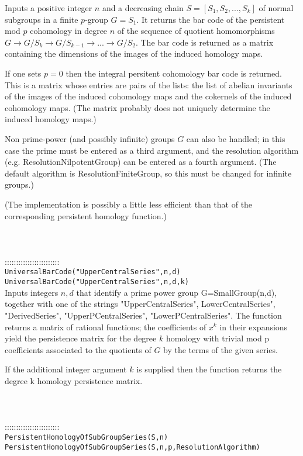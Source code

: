 \documentclass[a4paper,11pt]{report}
\begin{document}
{ Inputs a positive integer $n$ and a decreasing chain $S=[S_1, S_2, ..., S_k]$ of normal subgroups in a finite $p$-group $G=S_1$. It returns the bar code of the persistent mod $p$ cohomology in degree $n$ of the sequence of quotient homomorphisms $G \rightarrow G/S_k \rightarrow G/S_{k-1} \rightarrow ... \rightarrow G/S_2 $. The bar code is returned as a matrix containing the dimensions of the images
of the induced homology maps. 

 If one sets $p=0$ then the integral persitent cohomology bar code is returned. This is a matrix
whose entries are pairs of the lists: the list of abelian invariants of the
images of the induced cohomology maps and the cokernels of the induced
cohomology maps. (The matrix probably does not uniquely determine the induced
homology maps.) 

 Non prime-power (and possibly infinite) groups $G$ can also be handled; in this case the prime must be entered as a third
argument, and the resolution algorithm (e.g. ResolutionNilpotentGroup) can be
entered as a fourth argument. (The default algorithm is ResolutionFiniteGroup,
so this must be changed for infinite groups.) 

 (The implementation is possibly a little less efficient than that of the
corresponding persistent homology function.) \\
 \\
 \\
 \\
 ::::::::::::::::::::::::\\
 \texttt{UniversalBarCode("UpperCentralSeries",n,d)}\\
 \texttt{UniversalBarCode("UpperCentralSeries",n,d,k)}\\
 

 Inputs integers $n,d$ that identify a prime power group G=SmallGroup(n,d), together with one of the
strings "UpperCentralSeries", LowerCentralSeries", "DerivedSeries",
"UpperPCentralSeries", "LowerPCentralSeries". The function returns a matrix of
rational functions; the coefficients of $x^k$ in their expansions yield the persistence matrix for the degree $k$ homology with trivial mod p coefficients associated to the quotients of $G$ by the terms of the given series. 

 If the additional integer argument $k$ is supplied then the function returns the degree k homology persistence
matrix. \\
 \\
 \\
 \\
 ::::::::::::::::::::::::\\
 \texttt{PersistentHomologyOfSubGroupSeries(S,n)}\\
 \texttt{PersistentHomologyOfSubGroupSeries(S,n,p,Resolution{\textunderscore}Algorithm)}\\
 

}
\end{document}
